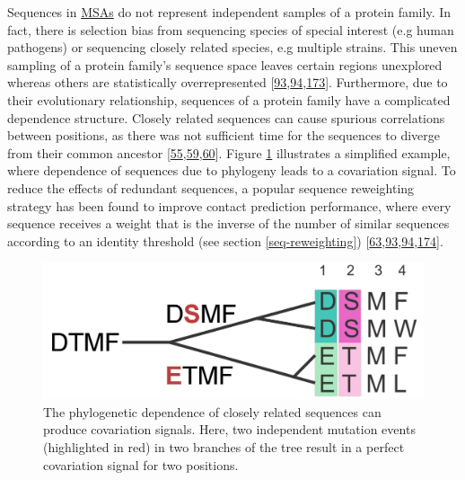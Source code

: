 \documentclass[11pt,a4paper,twoside]{book}
\theoremstyle{definition}
\theoremstyle{definition}
\theoremstyle{remark}
\begin{document}
Sequences in \protect\hyperlink{abbrev}{MSAs} do not represent
independent samples of a protein family. In fact, there is selection
bias from sequencing species of special interest (e.g human pathogens)
or sequencing closely related species, e.g multiple strains. This uneven
sampling of a protein family's sequence space leaves certain regions
unexplored whereas others are statistically overrepresented
{[}\protect\hyperlink{ref-Morcos2011}{93},\protect\hyperlink{ref-Cocco2017}{94},\protect\hyperlink{ref-Marks2012}{173}{]}.
Furthermore, due to their evolutionary relationship, sequences of a
protein family have a complicated dependence structure. Closely related
sequences can cause spurious correlations between positions, as there
was not sufficient time for the sequences to diverge from their common
ancestor
{[}\protect\hyperlink{ref-Gouveia_Oliveira2007}{55},\protect\hyperlink{ref-Lapedes1999}{59},\protect\hyperlink{ref-Burger2010}{60}{]}.
Figure \ref{fig:phylogenetic-effect} illustrates a simplified example,
where dependence of sequences due to phylogeny leads to a covariation
signal. To reduce the effects of redundant sequences, a popular sequence
reweighting strategy has been found to improve contact prediction
performance, where every sequence receives a weight that is the inverse
of the number of similar sequences according to an identity threshold
(see section \ref{seq-reweighting})
{[}\protect\hyperlink{ref-Jones2012}{63},\protect\hyperlink{ref-Morcos2011}{93},\protect\hyperlink{ref-Cocco2017}{94},\protect\hyperlink{ref-Buslje2009}{174}{]}.






\begin{figure}

{\centering \includegraphics[width=0.6\linewidth]{img/intro/phylogenetic_effect} 

}

\caption{The phylogenetic dependence of closely
related sequences can produce covariation signals. Here, two independent
mutation events (highlighted in red) in two branches of the tree result
in a perfect covariation signal for two positions.}\label{fig:phylogenetic-effect}
\end{figure}
\end{document}

